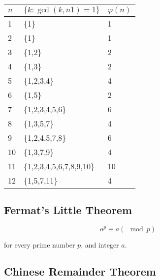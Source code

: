 \documentclass[11pt]{article}
\theoremstyle{plain}
\theoremstyle{definition}
\begin{document}
\begin{center}
  \begin{tabular}{l l l}
    $n$ & $\{k : \gcd(k, n1) = 1\}$ & $\varphi(n)$ \\
    \hline
    1  & \{1\}                    & 1 \\
    2  & \{1\}                    & 1 \\
    3  & \{1,2\}                  & 2 \\
    4  & \{1,3\}                  & 2 \\
    5  & \{1,2,3,4\}              & 4 \\
    6  & \{1,5\}                  & 2 \\
    7  & \{1,2,3,4,5,6\}          & 6 \\
    8  & \{1,3,5,7\}              & 4 \\
    9  & \{1,2,4,5,7,8\}          & 6 \\
    10 & \{1,3,7,9\}              & 4 \\
    11 & \{1,2,3,4,5,6,7,8,9,10\} & 10 \\
    12 & \{1,5,7,11\}             & 4 \\
  \end{tabular}
\end{center}

\subsection*{Fermat's Little Theorem}

$$
a^p \equiv a (\mod p)
$$

for every prime number $p$, and integer $a$.

\subsection*{Chinese Remainder Theorem}
\end{document}
